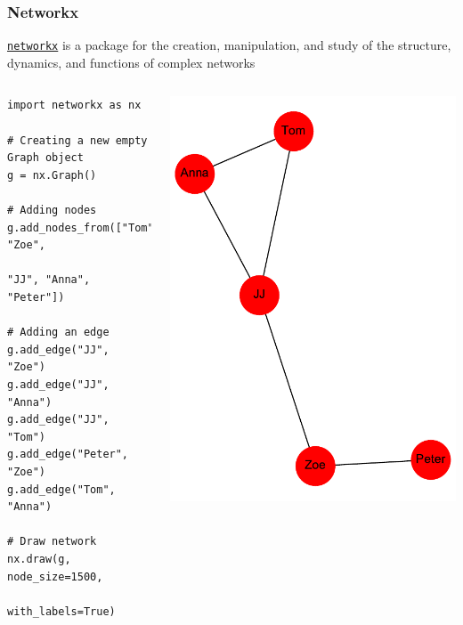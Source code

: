 \documentclass[pdf]{beamer}
\begin{document}
\begin{frame}[fragile]
\frametitle{Networkx}

\href{https://networkx.github.io/}{\texttt{networkx}} is a package 
for the creation, manipulation, and study of the structure, dynamics, and functions of complex networks

\vfill

\begin{columns}
\begin{lstlisting}[style=python]
import networkx as nx

# Creating a new empty Graph object
g = nx.Graph()

# Adding nodes
g.add_nodes_from(["Tom", "Zoe", 
                  "JJ", "Anna", "Peter"])

# Adding an edge
g.add_edge("JJ", "Zoe")
g.add_edge("JJ", "Anna")
g.add_edge("JJ", "Tom")
g.add_edge("Peter", "Zoe")
g.add_edge("Tom", "Anna")

# Draw network
nx.draw(g, node_size=1500, 
        with_labels=True)
\end{lstlisting}

\centering
\includegraphics[width=\textwidth]{netx.pdf}
\end{columns}

\end{frame}
\end{document}
